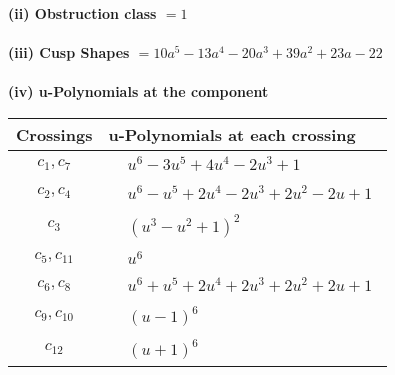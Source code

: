 \documentclass[1p]{elsarticle_modified}
\theoremstyle{definition}
\begin{document}
\flushleft \textbf{(ii) Obstruction class $= 1$}\\~\\
\flushleft \textbf{(iii) Cusp Shapes $= 10 a^5-13 a^4-20 a^3+39 a^2+23 a-22$}\\~\\
\newpage\renewcommand{\arraystretch}{1}
\flushleft \textbf{(iv) u-Polynomials at the component}\newline \\
\begin{tabular}{m{50pt}|m{274pt}}
Crossings & \hspace{64pt}u-Polynomials at each crossing \\
\hline $$\begin{aligned}c_{1},c_{7}\end{aligned}$$&$\begin{aligned}
&u^6-3 u^5+4 u^4-2 u^3+1
\end{aligned}$\\
\hline $$\begin{aligned}c_{2},c_{4}\end{aligned}$$&$\begin{aligned}
&u^6- u^5+2 u^4-2 u^3+2 u^2-2 u+1
\end{aligned}$\\
\hline $$\begin{aligned}c_{3}\end{aligned}$$&$\begin{aligned}
&(u^3- u^2+1)^2
\end{aligned}$\\
\hline $$\begin{aligned}c_{5},c_{11}\end{aligned}$$&$\begin{aligned}
&u^6
\end{aligned}$\\
\hline $$\begin{aligned}c_{6},c_{8}\end{aligned}$$&$\begin{aligned}
&u^6+u^5+2 u^4+2 u^3+2 u^2+2 u+1
\end{aligned}$\\
\hline $$\begin{aligned}c_{9},c_{10}\end{aligned}$$&$\begin{aligned}
&(u-1)^6
\end{aligned}$\\
\hline $$\begin{aligned}c_{12}\end{aligned}$$&$\begin{aligned}
&(u+1)^6
\end{aligned}$\\
\hline
\end{tabular}\\~\\
\end{document}
